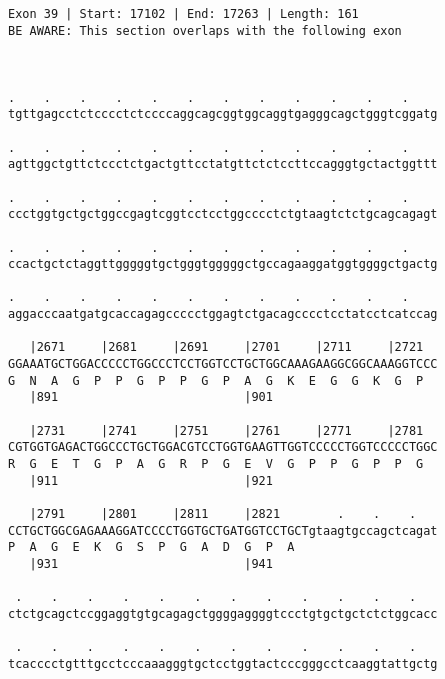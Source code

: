 \documentclass{article}
\begin{document}
\begin{Verbatim}
                                                      
 
Exon 39 | Start: 17102 | End: 17263 | Length: 161
BE AWARE: This section overlaps with the following exon



.    .    .    .    .    .    .    .    .    .    .    .    
tgttgagcctctcccctctccccaggcagcggtggcaggtgagggcagctgggtcggatg
                                                            
.    .    .    .    .    .    .    .    .    .    .    .    
agttggctgttctccctctgactgttcctatgttctctccttccagggtgctactggttt
                                                            
.    .    .    .    .    .    .    .    .    .    .    .    
ccctggtgctgctggccgagtcggtcctcctggcccctctgtaagtctctgcagcagagt
                                                            
.    .    .    .    .    .    .    .    .    .    .    .    
ccactgctctaggttgggggtgctgggtgggggctgccagaaggatggtggggctgactg
                                                            
.    .    .    .    .    .    .    .    .    .    .    .    
aggacccaatgatgcaccagagccccctggagtctgacagcccctcctatcctcatccag
                                                            
   |2671     |2681     |2691     |2701     |2711     |2721  
GGAAATGCTGGACCCCCTGGCCCTCCTGGTCCTGCTGGCAAAGAAGGCGGCAAAGGTCCC
G  N  A  G  P  P  G  P  P  G  P  A  G  K  E  G  G  K  G  P  
   |891                          |901                       
  
   |2731     |2741     |2751     |2761     |2771     |2781  
CGTGGTGAGACTGGCCCTGCTGGACGTCCTGGTGAAGTTGGTCCCCCTGGTCCCCCTGGC
R  G  E  T  G  P  A  G  R  P  G  E  V  G  P  P  G  P  P  G  
   |911                          |921                       
  
   |2791     |2801     |2811     |2821        .    .    .   
CCTGCTGGCGAGAAAGGATCCCCTGGTGCTGATGGTCCTGCTgtaagtgccagctcagat
P  A  G  E  K  G  S  P  G  A  D  G  P  A                    
   |931                          |941                       
  
 .    .    .    .    .    .    .    .    .    .    .    .   
ctctgcagctccggaggtgtgcagagctggggaggggtccctgtgctgctctctggcacc
                                                            
 .    .    .    .    .    .    .    .    .    .    .    .   
tcacccctgtttgcctcccaaagggtgctcctggtactcccgggcctcaaggtattgctg
                                                            

\end{Verbatim}
\end{document}
